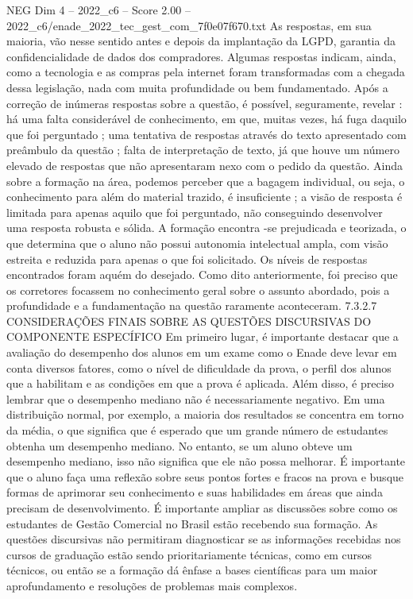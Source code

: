 \begin{textsample}{NEG Dim 4 – 2022\_c6 – Score 2.00 – 2022\_c6/enade\_2022\_tec\_gest\_com\_7f0e07f670.txt}
As respostas, em sua maioria, vão nesse sentido antes e depois da implantação da LGPD, garantia da confidencialidade de dados dos compradores.
Algumas respostas indicam, ainda, como a tecnologia e as compras pela internet foram transformadas com a chegada dessa legislação, nada com muita profundidade ou bem fundamentado.
Após a correção de inúmeras respostas sobre a questão, é possível, seguramente, revelar : há uma falta considerável de conhecimento, em que, muitas vezes, há fuga daquilo que foi perguntado ; uma tentativa de respostas através do texto apresentado com preâmbulo da questão ; falta de interpretação de texto, já que houve um número elevado de respostas que não apresentaram nexo com o pedido da questão.
Ainda sobre a formação na área, podemos perceber que a bagagem individual, ou seja, o conhecimento para além do material trazido, é insuficiente ; a visão de resposta é limitada para apenas aquilo que foi perguntado, não conseguindo desenvolver uma resposta robusta e sólida.
A formação encontra -se prejudicada e teorizada, o que determina que o aluno não possui autonomia intelectual ampla, com visão estreita e reduzida para apenas o que foi solicitado.
Os níveis de respostas encontrados foram aquém do desejado.
Como dito anteriormente, foi preciso que os corretores focassem no conhecimento geral sobre o assunto abordado, pois a profundidade e a fundamentação na questão raramente aconteceram. 7.3.2.7 CONSIDERAÇÕES FINAIS SOBRE AS QUESTÕES DISCURSIVAS DO COMPONENTE ESPECÍFICO Em primeiro lugar, é importante destacar que a avaliação do desempenho dos alunos em um exame como o Enade deve levar em conta diversos fatores, como o nível de dificuldade da prova, o perfil dos alunos que a habilitam e as condições em que a prova é aplicada.
Além disso, é preciso lembrar que o desempenho mediano não é necessariamente negativo.
Em uma distribuição normal, por exemplo, a maioria dos resultados se concentra em torno da média, o que significa que é esperado que um grande número de estudantes obtenha um desempenho mediano.
No entanto, se um aluno obteve um desempenho mediano, isso não significa que ele não possa melhorar.
É importante que o aluno faça uma reflexão sobre seus pontos fortes e fracos na prova e busque formas de aprimorar seu conhecimento e suas habilidades em áreas que ainda precisam de desenvolvimento.
É importante ampliar as discussões sobre como os estudantes de Gestão Comercial no Brasil estão recebendo sua formação.
As questões discursivas não permitiram diagnosticar se as informações recebidas nos cursos de graduação estão sendo prioritariamente técnicas, como em cursos técnicos, ou então se a formação dá ênfase a bases científicas para um maior aprofundamento e resoluções de problemas mais complexos.

\end{textsample}

